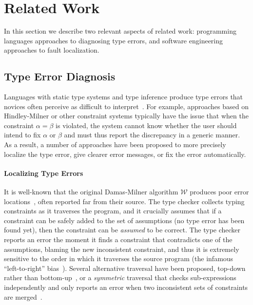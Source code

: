 \section{Related Work}
\label{sec:related-work}

In this section we describe two relevant aspects of related work:
%
programming languages approaches to diagnosing type errors, and
%
software engineering approaches to fault localization.
%

\subsection{Type Error Diagnosis}
\label{sec:type-error-diagnosis}
Languages with static type systems and type inference produce type
errors that novices often perceive as difficult to
interpret~\citep{Wand1986-nw}.
%
For example, approaches based on Hindley-Milner or other constraint
systems typically have the issue that when the constraint $\alpha=\beta$
is violated, the system cannot know whether the user should intend to
fix $\alpha$ or $\beta$ and must thus report the discrepancy in a
generic manner.
%
As a result, a number of approaches have been proposed to
more precisely localize the type error,
give clearer error messages, or
fix the error automatically.
%

\paragraph{Localizing Type Errors}
It is well-known that the original Damas-Milner algorithm $\mathcal{W}$
produces poor error locations~\citep{Wand1986-nw}, often reported far
from their source.
%
The type checker collects typing constraints as it traverses the
program, and it crucially assumes that if a constraint can be safely
added to the set of assumptions (\ie no type error has been found yet),
then the constraint can be \emph{assumed} to be correct.
%
The type checker reports an error the moment it finds a constraint that
contradicts one of the assumptions, blaming the new inconsistent
constraint, and thus it is extremely sensitive to the order in which it
traverses the source program (the infamous ``left-to-right''
bias~\citep{McAdam1998-ub}).
%
Several alternative traversal have been proposed, \eg
top-down rather than bottom-up~\citep{Lee1998-ys}, or a \emph{symmetric}
traversal that checks sub-expressions independently and only reports an
error when two inconsistent sets of constraints are
merged~\citep{McAdam1998-ub,Yang1999-yr}.

